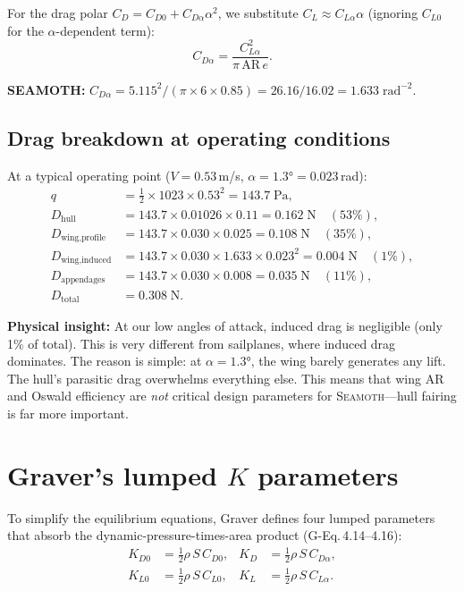 \documentclass[11pt,a4paper]{article}
\newcommand{\seamoth}{\textsc{Seamoth}}
\newcommand{\half}{\tfrac{1}{2}}
\newcommand{\note}[1]{\par\smallskip\noindent\colorbox{blue!8}{\parbox{\dimexpr\linewidth-2\fboxsep}{%
  \small\textbf{SEAMOTH:} #1}}\smallskip}
\newcommand{\insight}[1]{\par\smallskip\noindent\colorbox{green!8}{\parbox{\dimexpr\linewidth-2\fboxsep}{%
  \small\textbf{Physical insight:} #1}}\smallskip}
\begin{document}
For the drag polar $C_D = C_{D0} + C_{D\alpha}\alpha^2$, we substitute
$C_L \approx C_{L\alpha}\alpha$ (ignoring $C_{L0}$ for the $\alpha$-dependent term):
\begin{equation}
  C_{D\alpha} = \frac{C_{L\alpha}^2}{\pi\,\mathrm{AR}\,e}.
  \label{eq:CDalpha}
\end{equation}

\note{$C_{D\alpha} = 5.115^2 / (\pi \times 6 \times 0.85) = 26.16/16.02 = \mathbf{1.633}\;\mathrm{rad}^{-2}$.}

\subsection{Drag breakdown at operating conditions}

At a typical operating point ($V=0.53$\,m/s, $\alpha=1.3°=0.023$\,rad):
\begin{align*}
  q &= \half\times1023\times0.53^2 = 143.7\;\text{Pa}, \\
  D_\text{hull} &= 143.7\times0.01026\times0.11 = 0.162\;\text{N} \quad(53\%), \\
  D_\text{wing,profile} &= 143.7\times0.030\times0.025 = 0.108\;\text{N} \quad(35\%), \\
  D_\text{wing,induced} &= 143.7\times0.030\times1.633\times0.023^2 = 0.004\;\text{N} \quad(1\%), \\
  D_\text{appendages} &= 143.7\times0.030\times0.008 = 0.035\;\text{N} \quad(11\%), \\
  D_\text{total} &= 0.308\;\text{N}.
\end{align*}

\insight{At our low angles of attack, induced drag is negligible (only 1\% of total).
This is very different from sailplanes, where induced drag dominates.  The reason is
simple: at $\alpha=1.3°$, the wing barely generates any lift.  The hull's parasitic drag
overwhelms everything else.  This means that wing AR and Oswald efficiency are
\emph{not} critical design parameters for \seamoth{}---hull fairing is far more important.}


\section{Graver's lumped $K$ parameters}
\label{sec:Kparams}

To simplify the equilibrium equations, Graver defines four lumped parameters that
absorb the dynamic-pressure-times-area product (G-Eq.\,4.14--4.16):
\begin{align}
  K_{D0} &= \half\rho\,S\,C_{D0}, &
  K_D    &= \half\rho\,S\,C_{D\alpha}, \label{eq:KDdef} \\
  K_{L0} &= \half\rho\,S\,C_{L0}, &
  K_L    &= \half\rho\,S\,C_{L\alpha}. \label{eq:KLdef}
\end{align}
\end{document}
